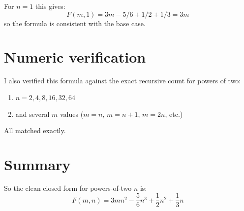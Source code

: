 \documentclass[10pt]{article}
\begin{document}
For $n = 1$ this gives:
\[F(m,1) = 3m - 5/6 + 1/2 + 1/3 = 3m\]
so the formula is consistent with the base case.


\section{Numeric verification}

I also verified this formula against the exact recursive count for powers of two:
\begin{enumerate}
    \item $n = 2, 4, 8, 16, 32, 64$
    \item and several $m$ values ($m=n$, $m=n+1$, $m=2n$, etc.)
\end{enumerate}
All matched exactly.


\section{Summary}

So the clean closed form for powers-of-two $n$ is:
\[F(m,n) = 3 m n^2 - \frac{5}{6} n^3 + \frac{1}{2} n^2 + \frac{1}{3} n\]
\end{document}
